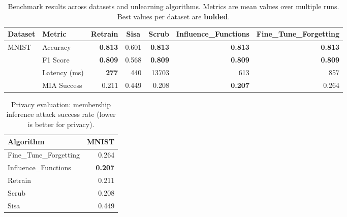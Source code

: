 %
%
% 


\begin{table}[t]
\centering
\caption{Benchmark results across datasets and unlearning algorithms. Metrics are mean values over multiple runs. Best values per dataset are \textbf{bolded}.}
\label{tab:main_results}
\small
\setlength{\tabcolsep}{4pt}
\begin{tabular}{llrrrrr}
\toprule
Dataset & Metric & \multicolumn{1}{c}{Retrain} & \multicolumn{1}{c}{Sisa} & \multicolumn{1}{c}{Scrub} & \multicolumn{1}{c}{Influence\_Functions} & \multicolumn{1}{c}{Fine\_Tune\_Forgetting} \\
\midrule
MNIST & Accuracy & \textbf{0.813} & 0.601 & \textbf{0.813} & \textbf{0.813} & \textbf{0.813} \\
 & F1 Score & \textbf{0.809} & 0.568 & \textbf{0.809} & \textbf{0.809} & \textbf{0.809} \\
 & Latency (ms) & \textbf{277} & 440 & 13703 & 613 & 857 \\
 & MIA Success & 0.211 & 0.449 & 0.208 & \textbf{0.207} & 0.264 \\
\midrule
\bottomrule
\end{tabular}
\end{table}

\begin{table}[t]
\centering
\caption{Privacy evaluation: membership inference attack success rate (lower is better for privacy).}
\label{tab:privacy}
\small
\begin{tabular}{lr}
\toprule
Algorithm & MNIST \\
\midrule
Fine\_Tune\_Forgetting & 0.264 \\
Influence\_Functions & \textbf{0.207} \\
Retrain & 0.211 \\
Scrub & 0.208 \\
Sisa & 0.449 \\
\bottomrule
\end{tabular}
\end{table}
